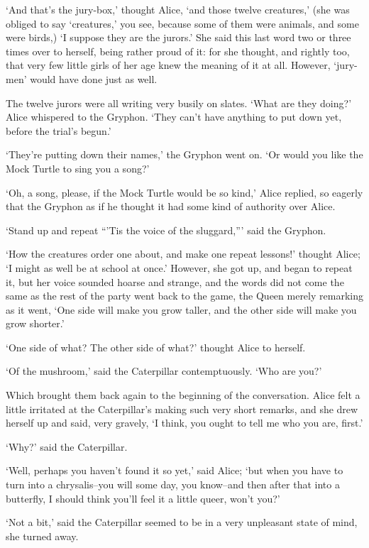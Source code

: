 \documentclass[statementpaper,twoside,openany]{memoir}
\begin{document}
`And that's the jury-box,' thought Alice, `and those twelve creatures,' (she was obliged to say `creatures,' you see, because some of them were animals, and some were birds,) `I suppose they are the jurors.' She said this last word two or three times over to herself, being rather proud of it: for she thought, and rightly too, that very few little girls of her age knew the meaning of it at all. However, `jury-men' would have done just as well.

The twelve jurors were all writing very busily on slates. `What are they doing?' Alice whispered to the Gryphon. `They can't have anything to put down yet, before the trial's begun.'

`They're putting down their names,' the Gryphon went on. `Or would you like the Mock Turtle to sing you a song?'

`Oh, a song, please, if the Mock Turtle would be so kind,' Alice replied, so eagerly that the Gryphon as if he thought it had some kind of authority over Alice.

`Stand up and repeat ``'Tis the voice of the sluggard,''' said the Gryphon.

`How the creatures order one about, and make one repeat lessons!' thought Alice; `I might as well be at school at once.' However, she got up, and began to repeat it, but her voice sounded hoarse and strange, and the words did not come the same as the rest of the party went back to the game, the Queen merely remarking as it went, `One side will make you grow taller, and the other side will make you grow shorter.'

`One side of what? The other side of what?' thought Alice to herself.

`Of the mushroom,' said the Caterpillar contemptuously. `Who are you?'

Which brought them back again to the beginning of the conversation. Alice felt a little irritated at the Caterpillar's making such very short remarks, and she drew herself up and said, very gravely, `I think, you ought to tell me who you are, first.'

`Why?' said the Caterpillar.

`Well, perhaps you haven't found it so yet,' said Alice; `but when you have to turn into a chrysalis--you will some day, you know--and then after that into a butterfly, I should think you'll feel it a little queer, won't you?'

`Not a bit,' said the Caterpillar seemed to be in a very unpleasant state of mind, she turned away.
\end{document}
